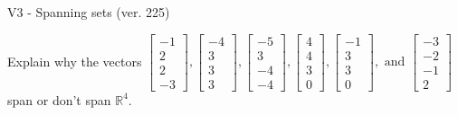 \begin{exercise}
  \begin{exerciseTitle}V3 - Spanning sets (ver. 225)\end{exerciseTitle}
  \begin{exerciseStatement}
    Explain why the vectors \(\left[\begin{array}{r}
-1 \\
2 \\
2 \\
-3
\end{array}\right] , \left[\begin{array}{r}
-4 \\
3 \\
3 \\
3
\end{array}\right] , \left[\begin{array}{r}
-5 \\
3 \\
-4 \\
-4
\end{array}\right] , \left[\begin{array}{r}
4 \\
4 \\
3 \\
0
\end{array}\right] , \left[\begin{array}{r}
-1 \\
3 \\
3 \\
0
\end{array}\right] , \text{ and } \left[\begin{array}{r}
-3 \\
-2 \\
-1 \\
2
\end{array}\right]\) span or don't span \(\mathbb{R}^4\). 
	



\end{exerciseStatement}
\end{exercise}
